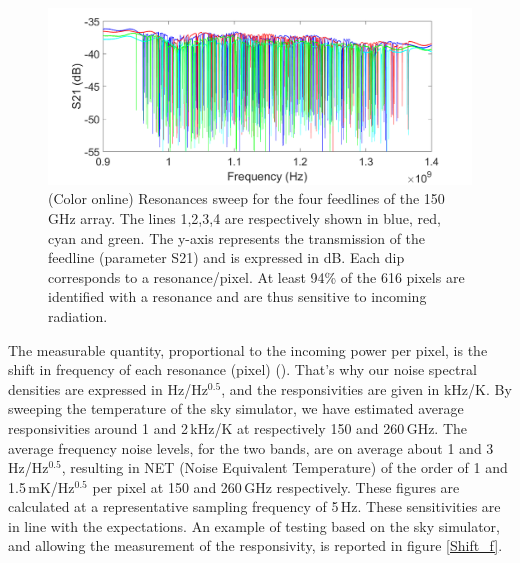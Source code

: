 \documentclass[]{aa} %
\begin{document}
\begin{figure}[h]
\begin{center}
   \centering
    \includegraphics[width=1.0\linewidth]{VNA_scans_150GHz.png}
    \caption{(Color online) Resonances sweep for the four feedlines of the 150\,GHz array. The lines 1,2,3,4 are respectively shown in blue, red, cyan and green. The y-axis represents the transmission of the feedline (parameter S21) and is expressed in dB. Each dip corresponds to a resonance/pixel. At least 94\% of the 616 pixels are identified with a resonance and are thus sensitive to incoming radiation.}
         \label{VNA}
\end{center}
\end{figure}

The measurable quantity, proportional to the incoming power per pixel, is the shift in frequency of each resonance (pixel) (\cite{Swenson2010}). That's why our noise spectral densities are expressed in Hz/Hz$^{0.5}$, and the responsivities are given in kHz/K. By sweeping the temperature of the sky simulator, we have estimated average responsivities around 1 and 2\,kHz/K at respectively 150 and 260\,GHz. The average frequency noise levels, for the two bands, are on average about 1 and 3\,Hz/Hz$^{0.5}$, resulting in NET (Noise Equivalent Temperature) of the order of 1 and 1.5\,mK/Hz$^{0.5}$ per pixel at 150 and 260\,GHz respectively. These figures are calculated at a representative sampling frequency of 5\,Hz. 
These sensitivities are in line with the expectations. An example of testing based on the sky simulator, and allowing the measurement of the responsivity, is reported in figure \ref{Shift_f}. 
\end{document}
